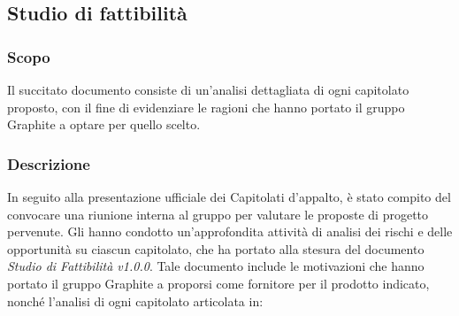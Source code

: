 \documentclass[../NormediProgetto.tex]{subfiles}
\begin{document}

\subsection{Studio di fattibilità}

\subsubsection{Scopo}

Il succitato documento consiste di un'analisi dettagliata di ogni capitolato proposto, con il fine di evidenziare le ragioni che hanno portato il gruppo Graphite a optare per quello scelto. 

\subsubsection{Descrizione}
In seguito alla presentazione ufficiale dei Capitolati d'appalto, è
stato compito del  convocare una riunione interna al gruppo per valutare le proposte di progetto pervenute. Gli  hanno condotto un'approfondita attività di analisi dei rischi e delle opportunità su ciascun capitolato, che ha portato alla stesura del documento \textit{Studio di Fattibilità v1.0.0}.
Tale documento include le motivazioni che hanno portato il gruppo Graphite a proporsi come fornitore per il prodotto indicato, nonché l'analisi di ogni capitolato articolata in:
\end{document}
